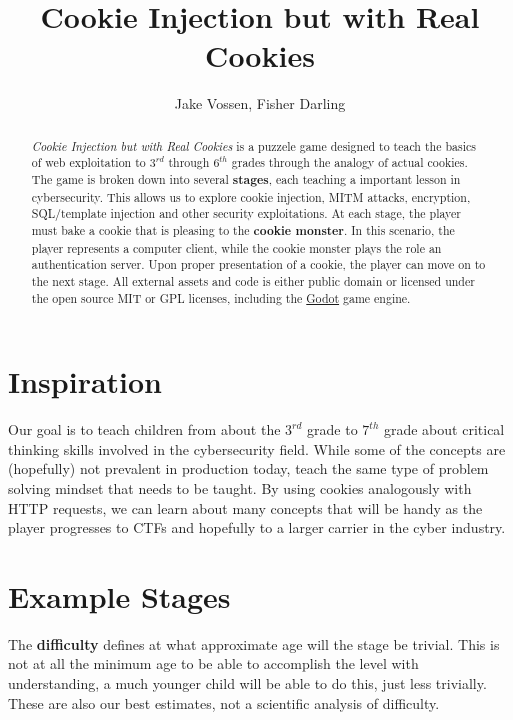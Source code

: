 \documentclass{article}
\begin{document}
\title{Cookie Injection but with Real Cookies}
\author{Jake Vossen, Fisher Darling}

\maketitle

\begin{abstract}
  
\textit{Cookie Injection but with Real Cookies} is a puzzele game
designed to teach the basics of web exploitation to $3^{rd}$ through
$6^{th}$ grades through the analogy of actual cookies. The game is
broken down into several \textbf{stages}, each teaching a important
lesson in cybersecurity. This allows us to explore cookie injection,
MITM attacks, encryption, SQL/template injection and other security
exploitations. At each stage, the player must bake a cookie that is
pleasing to the \textbf{cookie monster}. In this scenario, the player
represents a computer client, while the cookie monster plays the role
an authentication server. Upon proper presentation of a cookie, the
player can move on to the next stage. All external assets and code is
either public domain or licensed under the open source MIT or GPL
licenses, including the \href{https://godotengine.org}{Godot} game
engine.



\end{abstract}

\section{Inspiration}

Our goal is to teach children from about the $3^{rd}$ grade to
$7^{th}$ grade about critical thinking skills involved in the cybersecurity
field. While some of the concepts are (hopefully) not prevalent in
production today, teach the same type of problem solving mindset that
needs to be taught. By using cookies analogously with HTTP requests,
we can learn about many concepts that will be handy as the player
progresses to CTFs and hopefully to a larger carrier in the cyber
industry. 

\section{Example Stages}

The \textbf{difficulty} defines at what approximate age will the stage
be trivial. This is not at all the minimum age to be able to accomplish
the level with understanding, a much younger child will be able to do
this, just less trivially. These are also our best estimates, not a
scientific analysis of difficulty.
\end{document}
